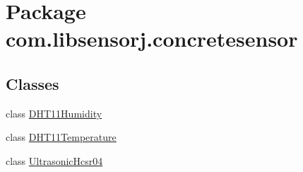 \hypertarget{namespacecom_1_1libsensorj_1_1concretesensor}{}\section{Package com.\+libsensorj.\+concretesensor}
\label{namespacecom_1_1libsensorj_1_1concretesensor}
\subsection*{Classes}
\begin{DoxyCompactItemize}
\item 
class \hyperlink{classcom_1_1libsensorj_1_1concretesensor_1_1DHT11Humidity}{D\+H\+T11\+Humidity}
\item 
class \hyperlink{classcom_1_1libsensorj_1_1concretesensor_1_1DHT11Temperature}{D\+H\+T11\+Temperature}
\item 
class \hyperlink{classcom_1_1libsensorj_1_1concretesensor_1_1UltrasonicHcsr04}{Ultrasonic\+Hcsr04}
\end{DoxyCompactItemize}
